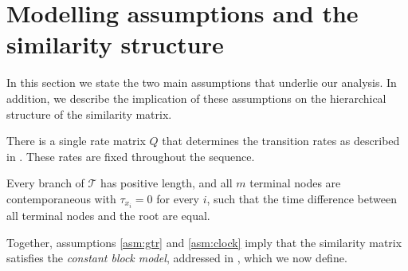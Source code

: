 \section{Modelling assumptions and the similarity structure}\label{sec:assumptions}

In this section we state the two main assumptions that underlie our analysis. In addition, we describe the implication of these assumptions on the hierarchical structure of the similarity matrix. %

\begin{assumption}\label{asm:gtr}
There is a single rate matrix $Q$ that determines the transition rates as described in . These rates are fixed throughout the sequence. 
\end{assumption}

\begin{assumption}\label{asm:clock}
Every branch of $\mathcal{T}$ has positive length, and all $m$ terminal nodes are contemporaneous with
$\tau_{x_i}=0$ for every $i$, such that the time difference between all terminal nodes and the root are equal.
\end{assumption}

Together, assumptions \ref{asm:gtr} and \ref{asm:clock} imply that the similarity matrix satisfies the \textit{constant block model}, addressed in \cite{Balakrishnan2011clustering}, which we now define. 


